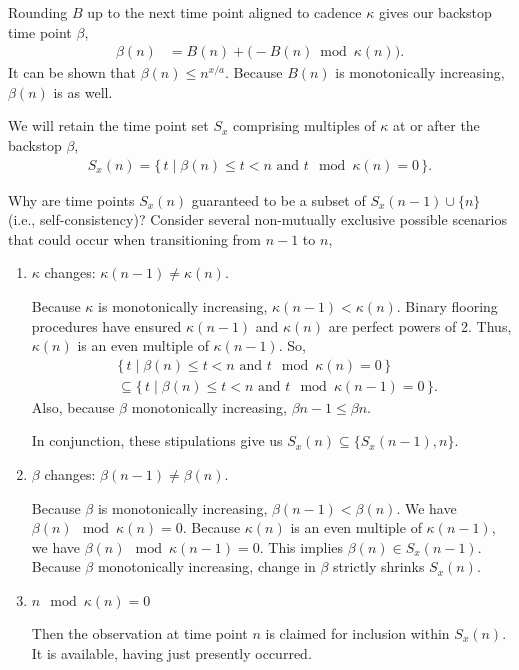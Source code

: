 Rounding $B$ up to the next time point aligned to cadence $\kappa$ gives our backstop time point $\beta$,
\begin{align*}
  \beta(n)
  &=
  B(n) + \big(-B(n) \bmod \kappa(n)\big).
\end{align*}
It can be shown that $\beta(n) \leq n^{x/a}$.
Because $B(n)$ is monotonically increasing, $\beta(n)$ is as well.

We will retain the time point set $S_x$ comprising multiples of $\kappa$ at or after the backstop $\beta$,
\begin{align*}
  S_x(n) = \{\, t \mid \beta(n) \leq t < n \text{ and } t \mod \kappa(n) = 0 \,\}.
\end{align*}

Why are time points $S_x(n)$ guaranteed to be a subset of $S_x(n-1) \cup \{n\}$ (i.e., self-consistency)?
Consider several non-mutually exclusive possible scenarios that could occur when transitioning from $n - 1$ to $n$,
\begin{enumerate}
  \item $\kappa$ changes: $\kappa(n - 1) \neq \kappa(n)$.

  Because $\kappa$ is monotonically increasing, $\kappa(n - 1) < \kappa(n)$.
  Binary flooring procedures have ensured $\kappa(n - 1)$ and $\kappa(n)$ are perfect powers of 2.
  Thus, $\kappa(n)$ is an even multiple of $\kappa(n - 1)$.
  So,
  \begin{align*}
    &\{\, t \mid \beta(n) \leq t < n \text{ and } t \mod \kappa(n) = 0 \,\}\\
    &\subseteq \{\, t \mid \beta(n) \leq t < n \text{ and } t \mod \kappa(n - 1) = 0 \,\}.
  \end{align*}
  Also, because $\beta$ monotonically increasing, $\beta{n - 1} \leq \beta{n}$.

  In conjunction, these stipulations give us $S_x(n) \subseteq \{S_x(n - 1), n\}$.

  \item $\beta$ changes: $\beta(n - 1) \neq \beta(n)$.

  Because $\beta$ is monotonically increasing, $\beta(n - 1) < \beta(n)$.
  We have $\beta(n) \mod \kappa(n) = 0$.
  Because $\kappa(n)$ is an even multiple of $\kappa(n - 1)$, we have $\beta(n) \mod \kappa(n - 1) = 0$.
  This implies $\beta(n) \in S_x(n - 1)$.
  Because $\beta$ monotonically increasing, change in $\beta$ strictly shrinks $S_x(n)$.

  \item $n \mod \kappa(n) = 0$

  Then the observation at time point $n$ is claimed for inclusion within $S_x(n)$.
  It is available, having just presently occurred.

\end{enumerate}


